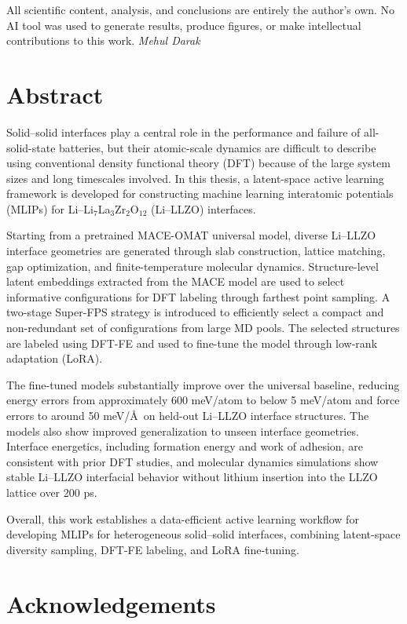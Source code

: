 \documentclass[12pt,a4paper,oneside]{book}
\begin{document}
All scientific content, analysis, and conclusions are entirely the author's own.
No AI tool was used to generate results, produce figures, or make intellectual
contributions to this work.
\hfill
\textit{Mehul Darak}

\chapter*{\centering Abstract}

\hspace{15pt}
Solid--solid interfaces play a central role in the performance and failure of
all-solid-state batteries, but their atomic-scale dynamics are difficult to
describe using conventional density functional theory (DFT) because of the large
system sizes and long timescales involved. In this thesis, a latent-space active
learning framework is developed for constructing machine learning interatomic
potentials (MLIPs) for Li--Li$_7$La$_3$Zr$_2$O$_{12}$ (Li--LLZO) interfaces.

Starting from a pretrained MACE-OMAT universal model, diverse Li--LLZO interface
geometries are generated through slab construction, lattice matching, gap
optimization, and finite-temperature molecular dynamics. Structure-level latent
embeddings extracted from the MACE model are used to select informative
configurations for DFT labeling through farthest point sampling. A two-stage
Super-FPS strategy is introduced to efficiently select a compact and
non-redundant set of configurations from large MD pools. The selected structures
are labeled using DFT-FE and used to fine-tune the model through low-rank
adaptation (LoRA).

The fine-tuned models substantially improve over the universal baseline,
reducing energy errors from approximately 600 meV/atom to below 5 meV/atom and
force errors to around 50 meV/\AA\ on held-out Li--LLZO interface structures.
The models also show improved generalization to unseen interface geometries.
Interface energetics, including formation energy and work of adhesion, are
consistent with prior DFT studies, and molecular dynamics simulations show
stable Li--LLZO interfacial behavior without lithium insertion into the LLZO
lattice over 200 ps.

Overall, this work establishes a data-efficient active learning workflow for
developing MLIPs for heterogeneous solid--solid interfaces, combining latent-space
diversity sampling, DFT-FE labeling, and LoRA fine-tuning.
\chapter*{\centering Acknowledgements}
\end{document}
